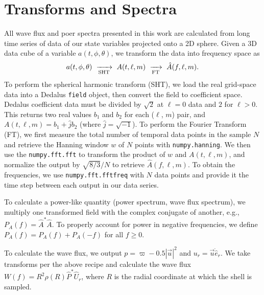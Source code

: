 \section{Transforms and Spectra}
\label{app:transforms}

All wave flux and poer spectra presented in this work are calculated from long time series of data of our state variables projected onto a 2D sphere.
Given a 3D data cube of a variable $a(t, \phi, \theta)$, we transform the data into frequency space as
\begin{equation}
a(t,\phi,\theta) \,\,\xrightarrow[\rm{SHT}]{}\,\,
A(t,\ell,m) \,\,\xrightarrow[\rm{FT}]{}\,\,
\hat{A}(f, \ell, m).
\end{equation}
To perform the spherical harmonic transform (SHT), we load the real grid-space data into a Dedalus \texttt{field} object, then convert the field to coefficient space.
Dedalus coefficient data must be divided by $\sqrt{2}$ at $\ell = 0$ data and $2$ for $\ell > 0$.
This returns two real values $b_1$ and $b_2$ for each ($\ell$, $m$) pair, and $A(t, \ell, m) = b_1 + \hat{j} b_2$ (where $\hat{j} = \sqrt{-1}$).
To perform the Fourier Transform (FT), we first measure the total number of temporal data points in the sample $N$ and retrieve the Hanning window $w$ of $N$ points with \texttt{numpy.hanning}.
We then use the \texttt{numpy.fft.fft} to transform the product of $w$ and $A(t, \ell, m)$, and normalize the output by $\sqrt{8/3}/N$ to retrieve $\hat{A}(f, \ell, m)$.
To obtain the frequencies, we use \texttt{numpy.fft.fftfreq} with $N$ data points and provide it the time step between each output in our data series.

To calculate a power-like quantity (power spectrum, wave flux spectrum), we multiply one transformed field with the complex conjugate of another, e.g., $P_A(f) = \hat{A}^* \hat{A}$.
To properly account for power in negative frequencies, we define $P_A(f) = P_A(f) + P_A(-f)$ for all $f \geq 0$.

To calculate the wave flux, we output $p = \varpi - 0.5 |\vec{u}|^2$ and $u_r = \vec{u}\dot\hat{e}_r$.
We take transforms per the above recipe and calculate the wave flux $W(f) = R^2\rho(R) \hat{P}^*\hat{U}_r$, where $R$ is the radial coordinate at which the shell is sampled.

